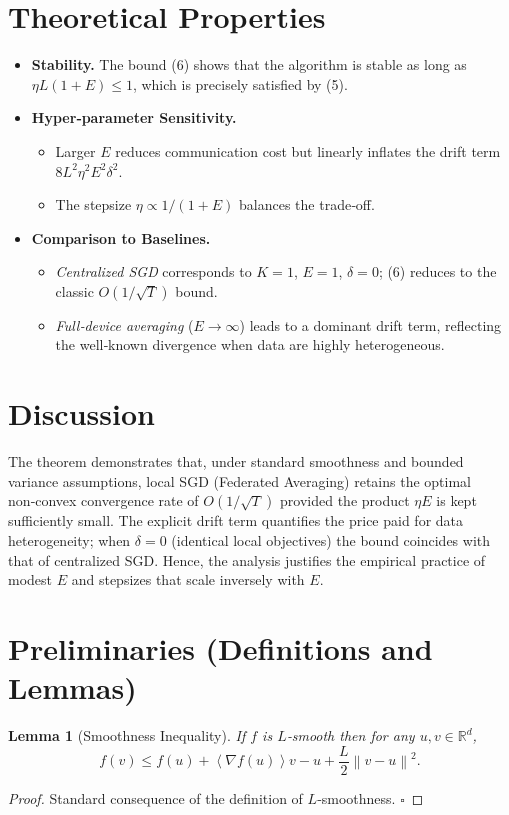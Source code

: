 \documentclass{article}
\newtheorem{lemma}{Lemma}
\newcommand{\norm}[1]{\left\|#1\right\|}
\newcommand{\inner}[1]{\left\langle #1 \right\rangle}
\begin{document}
\section*{Theoretical Properties}
\begin{itemize}
\item \textbf{Stability.} The bound (6) shows that the algorithm is stable
as long as $\eta L(1+E)\le 1$, which is precisely satisfied by (5).  
\item \textbf{Hyper‑parameter Sensitivity.}
    \begin{itemize}
        \item Larger $E$ reduces communication cost but linearly inflates the drift term $8L^2\eta^2E^2\delta^2$.
        \item The stepsize $\eta\propto 1/(1+E)$ balances the trade‑off.
    \end{itemize}
\item \textbf{Comparison to Baselines.}
    \begin{itemize}
        \item \emph{Centralized SGD} corresponds to $K=1$, $E=1$, $\delta=0$;
              (6) reduces to the classic $O(1/\sqrt{T})$ bound.
        \item \emph{Full‑device averaging} ($E\!\to\!\infty$) leads to a dominant drift term,
              reflecting the well‑known divergence when data are highly heterogeneous.
    \end{itemize}
\end{itemize}

\section*{Discussion}
The theorem demonstrates that, under standard smoothness and bounded
variance assumptions, local SGD (Federated Averaging) retains the optimal
non‑convex convergence rate of $O(1/\sqrt{T})$ provided the product
$\eta E$ is kept sufficiently small.  The explicit drift term quantifies
the price paid for data heterogeneity; when $\delta=0$ (identical
local objectives) the bound coincides with that of centralized SGD.
Hence, the analysis justifies the empirical practice of modest $E$ and
stepsizes that scale inversely with $E$.

\section*{Preliminaries (Definitions and Lemmas)}
\begin{lemma}[Smoothness Inequality]\label{lem:smooth}
If $f$ is $L$‑smooth then for any $u,v\in\mathbb{R}^d$,
\[
f(v)\le f(u)+\inner{\nabla f(u)}{v-u}+\frac{L}{2}\norm{v-u}^2 .
\]
\end{lemma}
\begin{proof}
Standard consequence of the definition of $L$‑smoothness. \hfill $\square$
\end{proof}
\end{document}
